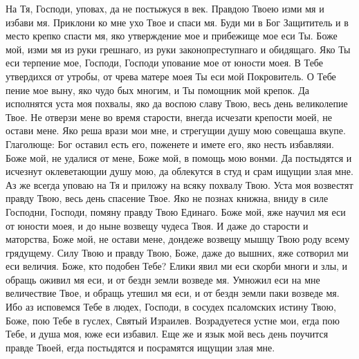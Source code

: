 \begin{mymulticols}


На Тя, Господи, уповах, да не постыжуся в век. Правдою Твоею изми мя и избави мя. Приклони ко мне ухо Твое и спаси мя. Буди ми в Бог Защититель и в место крепко спасти мя, яко утверждение мое и прибежище мое еси Ты. Боже мой, изми мя из руки грешнаго, из руки законопреступнаго и обидящаго. Яко Ты еси терпение мое, Господи, Господи упование мое от юности моея. В Тебе утвердихся от утробы, от чрева матере моея Ты еси мой Покровитель. О Тебе пение мое выну, яко чудо бых многим, и Ты помощник мой крепок. Да исполнятся уста моя похвалы, яко да воспою славу Твою, весь день великолепие Твое. Не отверзи мене во время старости, внегда исчезати крепости моей, не остави мене. Яко реша врази мои мне, и стрегущии душу мою совещаша вкупе. Глаголюще: Бог оставил есть его, поженете и имете его, яко несть избавляяи. Боже мой, не удалися от мене, Боже мой, в помощь мою вонми. Да постыдятся и исчезнут оклеветающии душу мою, да облекутся в студ и срам ищущии злая мне. Аз же всегда уповаю на Тя и приложу на всяку похвалу Твою. Уста моя возвестят правду Твою, весь день спасение Твое. Яко не познах книжна, вниду в силе Господни, Господи, помяну правду Твою Единаго. Боже мой, яже научил мя еси от юности моея, и до ныне возвещу чудеса Твоя. И даже до старости и маторства, Боже мой, не остави мене, дондеже возвещу мышцу Твою роду всему грядущему. Силу Твою и правду Твою, Боже, даже до вышних, яже сотворил ми еси величия. Боже, кто подобен Тебе? Елики явил ми еси скорби многи и злы, и обращь оживил мя еси, и от бездн земли возведе мя. Умножил еси на мне величествие Твое, и обращь утешил мя еси, и от бездн земли паки возведе мя. Ибо аз исповемся Тебе в людех, Господи, в сосудех псаломских истину Твою, Боже, пою Тебе в гуслех, Святый Израилев. Возрадуетеся устне мои, егда пою Тебе, и душа моя, юже еси избавил. Еще же и язык мой весь день поучится правде Твоей, егда постыдятся и посрамятся ищущии злая мне.





\end{mymulticols}

